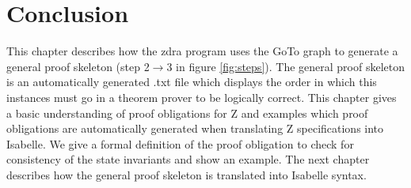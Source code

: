 \section{Conclusion}
\label{sec:skeletonsConclusion}

This chapter describes how the \gls{zdra} program uses the GoTo graph to
generate a general proof skeleton (step 2$\rightarrow$3 in figure
\ref{fig:steps}). The general proof skeleton is an automatically generated .txt
file which displays the order in which this instances must go in a theorem
prover to be logically correct. This chapter gives a basic understanding of
proof obligations for Z and examples which proof obligations are automatically
generated when translating Z specifications into Isabelle. We give a formal
definition of the proof obligation to check for consistency of the state
invariants and show an example. The next chapter describes how the general proof
skeleton is translated into Isabelle syntax.
